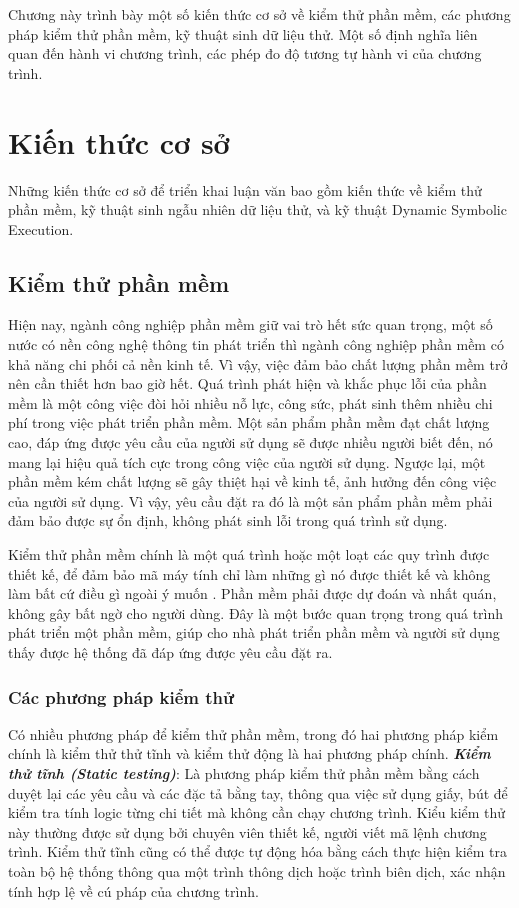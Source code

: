 Chương này trình bày một số kiến thức cơ sở về kiểm thử phần mềm, các phương pháp kiểm thử phần mềm, kỹ thuật sinh dữ liệu thử. Một số định nghĩa liên quan đến hành vi chương trình, các phép đo độ tương tự hành vi của chương trình.

\section{Kiến thức cơ sở}
Những kiến thức cơ sở để triển khai luận văn bao gồm kiến thức về kiểm thử phần mềm, kỹ thuật sinh ngẫu nhiên dữ liệu thử, và kỹ thuật Dynamic Symbolic Execution.

\subsection{Kiểm thử phần mềm}
Hiện nay, ngành công nghiệp phần mềm giữ vai trò hết sức quan trọng, một số nước có nền công nghệ thông tin phát triển thì ngành công nghiệp phần mềm có khả năng chi phối cả nền kinh tế. Vì vậy,  việc đảm bảo chất lượng phần mềm trở nên cần thiết hơn bao giờ hết. Quá trình phát hiện và khắc phục lỗi của phần mềm là một công việc đòi hỏi nhiều nỗ lực, công sức, phát sinh thêm nhiều chi phí trong việc phát triển phần mềm. Một sản phẩm phần mềm đạt chất lượng cao, đáp ứng được yêu cầu của người sử dụng sẽ được nhiều người biết đến, nó mang lại hiệu quả tích cực trong công việc của người sử dụng. Ngược lại, một phần mềm kém chất lượng sẽ gây thiệt hại về kinh tế, ảnh hưởng đến công việc của người sử dụng. Vì vậy, yêu cầu đặt ra đó là một sản phẩm phần mềm phải đảm bảo được sự ổn định, không phát sinh lỗi trong quá trình sử dụng.

Kiểm thử phần mềm chính là một quá trình hoặc một loạt các quy trình được thiết kế, để đảm bảo mã máy tính chỉ làm những gì nó được thiết kế và không làm bất cứ điều gì ngoài ý muốn \cite{myers2011art}. Phần mềm phải được dự đoán và nhất quán, không gây bất ngờ cho người dùng. Đây là một bước quan trọng trong quá trình phát triển một phần mềm, giúp cho nhà phát triển phần mềm và người sử dụng thấy được hệ thống đã đáp ứng được yêu cầu đặt ra.

\subsubsection{Các phương pháp kiểm thử}
Có nhiều phương pháp để kiểm thử phần mềm, trong đó hai phương pháp kiểm chính là kiểm thử thử tĩnh và kiểm thử động là hai phương pháp chính. \textbf{\textit{Kiểm thử tĩnh (Static testing)}}: Là phương pháp kiểm thử phần mềm bằng cách duyệt lại các yêu cầu và các đặc tả bằng tay, thông qua việc sử dụng giấy, bút để kiểm tra tính logic từng chi tiết mà không cần chạy chương trình. Kiểu kiểm thử này thường được sử dụng bởi chuyên viên thiết kế, người viết mã lệnh chương trình. Kiểm thử tĩnh cũng có thể được tự động hóa bằng cách thực hiện kiểm tra toàn bộ hệ thống thông qua một trình thông dịch hoặc trình biên dịch, xác nhận tính hợp lệ về cú pháp của chương trình.
		

